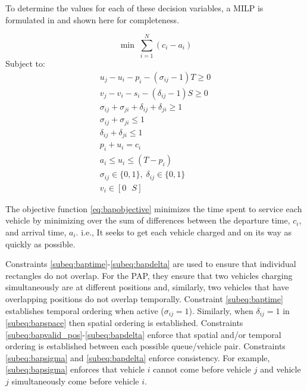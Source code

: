 To determine the values for each of these decision variables, a MILP is formulated in \cite{Qarebagh2019} and shown
here for completeness.

\begin{equation}
	\label{eq:bapobjective}
	\min\; \sum_{i=1}^N (c_i - a_i)
\end{equation}
Subject to:
\begin{subequations}
\label{eq:bapconstrs}
\begin{align}
    u_j - u_i - p_i - (\sigma_{ij} - 1)T \geq 0                  \label{subeq:baptime}          \\
    v_j - v_i - s_i - (\delta_{ij} - 1)S \geq 0                \label{subeq:bapspace}         \\
    \sigma_{ij} + \sigma_{ji} + \delta_{ij} + \delta_{ji} \geq 1 \label{subeq:bapvalid_pos}     \\
    \sigma_{ij} + \sigma_{ji} \leq 1                              \label{subeq:bapsigma}        \\
    \delta_{ij} + \delta_{ji} \leq 1                              \label{subeq:bapdelta}        \\
    p_i + u_i = c_i                                               \label{subeq:bapdetach}       \\
    a_i \leq u_i \leq (T - p_i)                                   \label{subeq:bapvalid_starts} \\
    \sigma_{ij} \in \{0,1\},\;\delta_{ij} \in \{0,1\}\;           \label{subeq:bapsdspace}      \\
    v_i \in [0 \mbox{ } S ]                                       \label{subeq:bapvspace}
\end{align}
\end{subequations}

\noindent

The objective function \autoref{eq:bapobjective} minimizes the time spent to service each vehicle by minimizing over the
sum of differences between the departure time, $c_i$, and arrival time, $a_i$. i.e., It seeks to get each vehicle
charged and on its way as quickly as possible.

Constraints \autoref{subeq:baptime}-\autoref{subeq:bapdelta} are used to ensure that individual rectangles do not overlap. For
the PAP, they ensure that two vehicles charging simultaneously are at different positions and, similarly, two vehicles
that have overlapping positions do not overlap temporally. Constraint \autoref{subeq:baptime} establishes temporal
ordering when active ($\sigma_{ij}=1$). Similarly, when $\delta_{ij} =1$ in \autoref{subeq:bapspace} then spatial ordering is
established. Constraints \autoref{subeq:bapvalid_pos}-\autoref{subeq:bapdelta} enforce that spatial and/or temporal ordering is
established between each possible queue/vehicle pair. Constraints \autoref{subeq:bapsigma} and \autoref{subeq:bapdelta}
enforce consistency. For example, \autoref{subeq:bapsigma} enforces that vehicle $i$ cannot come before vehicle $j$ and
vehicle $j$ simultaneously come before vehicle $i$.

